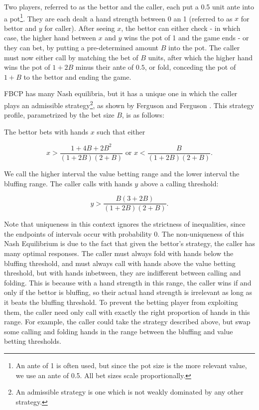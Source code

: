 \documentclass[../../main/main.tex]{subfiles}
\begin{document}
\begin{definition}[FBCP]
Two players, referred to as the bettor and the caller, each put a 0.5 unit ante into a pot\footnote{An ante of 1 is often used, but since the pot size is the more relevant value, we use an ante of 0.5. All bet sizes scale proportionally.}. They are each dealt a hand strength between 0 an 1 (referred to as $x$ for bettor and $y$ for caller). After seeing $x$, the bettor can either check - in which case, the higher hand between $x$ and $y$ wins the pot of 1 and the game ends - or they can bet, by putting a pre-determined amount $B$ into the pot. The caller must now either call by matching the bet of $B$ units, after which the higher hand wins the pot of $1+2B$ minus their ante of $0.5$, or fold, conceding the pot of $1+B$ to the bettor and ending the game.
\end{definition}

FBCP has many Nash equilibria, but it has a unique one in which the caller plays an admissible strategy\footnote{An admissible strategy is one which is not weakly dominated by any other strategy.}, as shown by Ferguson and Ferguson \cite[p. 2]{ferguson2003borel}. This strategy profile, parametrized by the bet size $B$, is as follows:

The bettor bets with hands $x$ such that either 

$$x > \frac{1 + 4B + 2B^2}{(1+2B)(2+B)} \text{ or } x < \frac{B}{(1+2B)(2+B)}. $$

We call the higher interval the value betting range and the lower interval the bluffing range. The caller calls with hands $y$ above a calling threshold:

$$ y > \frac{B(3 +2B)}{(1+2B)(2+B)}. $$

Note that uniqueness in this context ignores the strictness of inequalities, since the endpoints of intervals occur with probability 0. The non-uniqueness of this Nash Equilibrium is due to the fact that given the bettor's strategy, the caller has many optimal responses. The caller must always fold with hands below the bluffing threshold, and must always call with hands above the value betting threshold, but with hands inbetween, they are indifferent between calling and folding. This is because with a hand strength in this range, the caller wins if and only if the bettor is bluffing, so their actual hand strength is irrelevant as long as it beats the bluffing threshold. To prevent the betting player from exploiting them, the caller need only call with exactly the right proportion of hands in this range. For example, the caller could take the strategy described above, but swap some calling and folding hands in the range between the bluffing and value betting thresholds.
\end{document}

